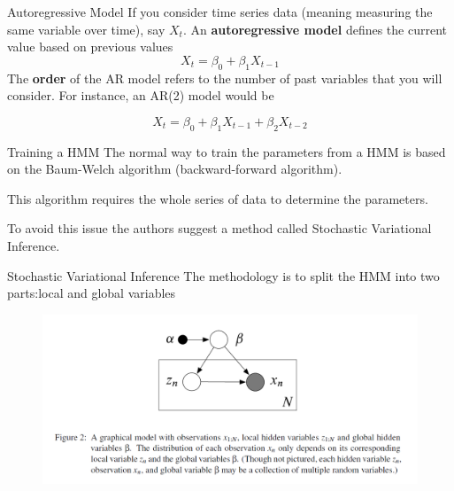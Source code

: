 \documentclass{beamer}
\begin{document}
\begin{frame}{Autoregressive Model}
If you consider time series data (meaning measuring the same variable over time), say $X_t$. An \textbf{autoregressive model} defines the current value based on previous values
\begin{equation*}
	X_t= \beta_0 + \beta_1 X_{t-1}
\end{equation*}	
The \textbf{order} of the AR model refers to the number of past variables that you will consider. For instance, an AR(2) model would be 

\begin{equation*}
X_t= \beta_0 + \beta_1 X_{t-1}+ \beta_2 X_{t-2}
\end{equation*}

\end{frame}
\begin{frame}{Training a HMM}
	The normal way to train the parameters from a HMM is based on the Baum-Welch algorithm (backward-forward algorithm).
	
	This algorithm requires the whole series of data to determine the parameters.
	
	To avoid this issue the authors suggest a method called Stochastic Variational Inference.
\end{frame}

\begin{frame}{Stochastic Variational Inference}
	The methodology is to split the HMM into two parts:local and global variables
	\begin{figure}[h]
		\centering
			\includegraphics[scale=0.4]{../Figures/fig_stoc_var_inference.png}
	\end{figure}
\end{frame}
\end{document}
